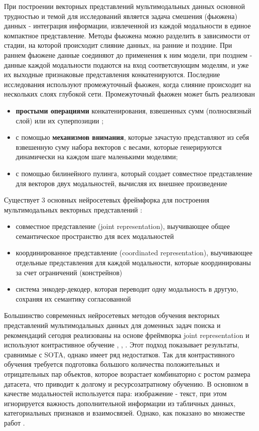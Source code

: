 \documentclass{article}
\begin{document}
При построении векторных представлений мультимодальных данных основной трудностью и темой для исследований является задача смешения (фьюжена) данных - интеграция информации, извлеченной из каждой модальности в единое компактное представление. Методы фьюжена можно разделить в зависимости от стадии, на которой происходит слияние данных, на ранние и поздние. При раннем фьюжене данные соединяют до применения к ним модели, при позднем - данные каждой модальности подаются на вход соответсвующим моделям, и уже их выходные признаковые представления конкатенируются. Последние исследования \citep{zhang2020multimodal} используют промежуточный фьюжен, когда слияние происходит на нескольких слоях глубокой сети. Промежуточный фьюжен может быть реализован 
\begin{itemize}
    \item \textbf{простыми операциями} конкатенирования, взвешенных сумм (полносвязный слой) или их суперпозиции \cite{nikzad2021berters};
    \item с помощью \textbf{механизмов внимания}, которые зачастую представляют из себя взвешенную суму набора векторов с весами, которые генерируются динамически на каждом шаге маленькими моделями; 
    \item с помощью билинейного пулинга, который создает совместное представление для векторов двух модальностей, вычисляя их внешнее произведение
\end{itemize}
  
Существует 3 основных нейросетевых фреймфорка для построения мультимодальных векторных представлений \citep{8715409}:
\begin{itemize}
    \item совместное представление (joint representation), выучивающее общее семантическое пространство для всех модальностей
    \item координированное представление (coordinated representation), выучивающее отдельные представления для каждой модальности, которые координированы за счет ограничений (констрейнов)
    \item система энкодер-декодер, которая переводит одну модальность в другую, сохраняя их семантику согласованной
\end{itemize}

\par Большинство современных нейросетевых методов обучения векторных представлений мультимодальных данных для доменных задач поиска и рекомендаций сегодня реализованы на основе фреймворка joint representation и используют контрастивное обучение \cite{Bai_2023_ICCV}, \cite{Dong_2022_CVPR}, \cite{huang2019multimodal}. Этот подход показывает результаты, сравнимые с SOTA, однако имеет ряд недостатков. Так для контрастивного обучения требуется подготовка большого количества положительных и отрицательных пар объектов, которое возрастает комбинаторно с ростом размера датасета, что приводит к долгому и ресурсозатратному обучению. 
В основном в качестве модальностей используется пара: изображение - текст, при этом игнорируется важность дополнительной информации из табличных данных, категориальных признаков и взаимосвязей. Однако, как показано во множестве работ \cite{}. 
\end{document}

